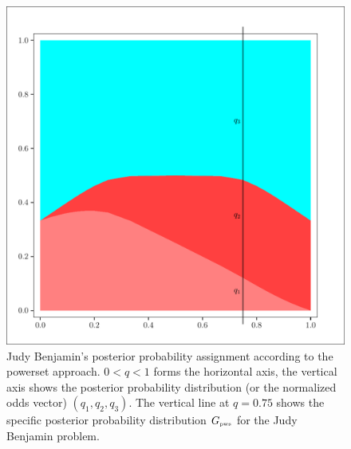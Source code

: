 \documentclass[12pt]{article}
\def\lwv{.6}
\begin{document}
\begin{figure}[h]
  \begin{flushright}
    \begin{minipage}[h]{\lwv\linewidth}
      \includegraphics[width=\textwidth]{zeroone-pwst.pdf}
      \caption{Judy Benjamin's posterior probability assignment
        according to the powerset approach. $0<q<1$ forms the
        horizontal axis, the vertical axis shows the posterior
        probability distribution (or the normalized odds vector)
        $(q_{1},q_{2},q_{3})$. The vertical line at $q=0.75$ shows the
        specific posterior probability distribution $G_{\mbox{\tiny
            pws}}$ for the Judy Benjamin problem.}
      \label{fig:pwst}
    \end{minipage}
  \end{flushright}
\end{figure}

\end{document}
